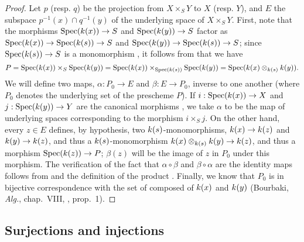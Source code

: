 \begin{proof}
\label{proof-1.3.4.9}
Let $p$ (resp. $q$) be the projection from $X\times_S Y$ to $X$ (resp. $Y$), and $E$ the subspace $p^{-1}(x)\cap q^{-1}(y)$ of the underlying space of $X\times_S Y$.
First, note that the morphisms $\Spec(\kres(x))\to S$ and $\Spec(\kres(y))\to S$ factor as $\Spec(\kres(x))\to\Spec(\kres(s))\to S$ and $\Spec(\kres(y))\to\Spec(\kres(s))\to S$; since $\Spec(\kres(s))\to S$ is a monomorphism , it follows from  that we have
\[
  P=\operatorname{Spec}(k(x))\times_S\operatorname{Spec}(k(y))=\operatorname{Spec}(k(x))\times_{\operatorname{Spec}(k(s))}\operatorname{Spec}(k(y))=\operatorname{Spec}(k(x)\otimes_{k(s)}k(y)).
\]
We will define two maps, $\alpha:P_0\to E$ and $\beta:E\to P_0$, inverse to one another (where $P_0$ denotes the underlying set of the prescheme $P$).
If $i:\Spec(\kres(x))\to X$ and $j:\Spec(\kres(y))\to Y$ are the canonical morphisms , we take $\alpha$ to be the map of underlying spaces corresponding to the morphism $i\times_S j$.
On the other hand, every $z\in E$ defines, by hypothesis, two $k(s)$-monomorphisms, $\kres(x)\to\kres(z)$ and $\kres(y)\to\kres(z)$, and thus a $k(s)$-monomorphism $\kres(x)\otimes_{\kres(s)}\kres(y)\to\kres(z)$, and thus a morphism $\Spec(\kres(z))\to P$; $\beta(z)$ will be the image of $z$ in $P_0$ under this morphism.
The verification of the fact that $\alpha\circ\beta$ and $\beta\circ\alpha$ are the identity maps follows from  and the definition of the product .
Finally, we know that $P_0$ is in bijective correspondence with the set of  composed of $k(x)$ and $k(y)$ (Bourbaki, \emph{Alg.}, chap.~VIII, , prop.~1).
\end{proof}

\subsection{Surjections and injections}
\label{subsection:1.3.5}

